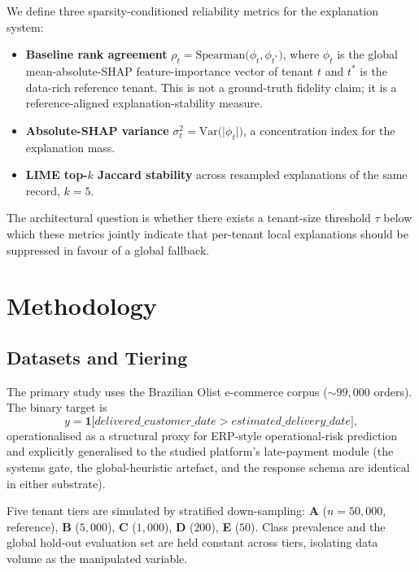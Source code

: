 \documentclass[conference]{IEEEtran}
\begin{document}
We define three sparsity-conditioned reliability metrics for the
explanation system:

\begin{itemize}
  \item \textbf{Baseline rank agreement} $\rho_t = \mathrm{Spearman}\bigl(
        \phi_t, \phi_{t^\ast}\bigr)$, where $\phi_t$ is the global
        mean-absolute-SHAP feature-importance vector of tenant $t$ and
        $t^\ast$ is the data-rich reference tenant. This is not a
        ground-truth fidelity claim; it is a reference-aligned
        explanation-stability measure.
  \item \textbf{Absolute-SHAP variance} $\sigma^2_t = \mathrm{Var}\bigl(
        \lvert\phi_t\rvert\bigr)$, a concentration index for the
        explanation mass.
  \item \textbf{LIME top-$k$ Jaccard stability} across resampled
        explanations of the same record, $k = 5$.
\end{itemize}

The architectural question is whether there exists a tenant-size
threshold $\tau$ below which these metrics jointly indicate that
per-tenant local explanations should be suppressed in favour of a global
fallback.

\section{Methodology}
\label{sec:method}

\subsection{Datasets and Tiering}
The primary study uses the Brazilian Olist e-commerce
corpus (${\sim}99{,}000$ orders). The binary target is
\[
y = \mathbf{1}\bigl[\textit{delivered\_customer\_date} >
                  \textit{estimated\_delivery\_date}\bigr],
\]
operationalised as a structural proxy for ERP-style operational-risk
prediction and explicitly generalised to the studied platform's
late-payment module (the systems gate, the global-heuristic artefact, and
the response schema are identical in either substrate).

Five tenant tiers are simulated by stratified down-sampling:
\textbf{A} ($n = 50{,}000$, reference),
\textbf{B} ($5{,}000$),
\textbf{C} ($1{,}000$),
\textbf{D} ($200$),
\textbf{E} ($50$). Class prevalence and the global hold-out evaluation
set are held constant across tiers, isolating data volume as the
manipulated variable.
\end{document}
